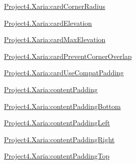 {\ttfamily \hyperlink{classproject4_1_1xaria_1_1R_1_1styleable_af0c0306982a503b9a005aebafa2f8251}{Project4.\+Xaria\+:card\+Corner\+Radius}}

{\ttfamily \hyperlink{classproject4_1_1xaria_1_1R_1_1styleable_a54bee07e94f96a7a6825da65d58be17f}{Project4.\+Xaria\+:card\+Elevation}}

{\ttfamily \hyperlink{classproject4_1_1xaria_1_1R_1_1styleable_a4be9ec95637f04c772f94899092a55f8}{Project4.\+Xaria\+:card\+Max\+Elevation}}

{\ttfamily \hyperlink{classproject4_1_1xaria_1_1R_1_1styleable_a335e1ca3184d29fcbeeec527602ab895}{Project4.\+Xaria\+:card\+Prevent\+Corner\+Overlap}}

{\ttfamily \hyperlink{classproject4_1_1xaria_1_1R_1_1styleable_a82b54eed1db5f90c00cd724eaee04e6e}{Project4.\+Xaria\+:card\+Use\+Compat\+Padding}}

{\ttfamily \hyperlink{classproject4_1_1xaria_1_1R_1_1styleable_a870488b5d76324f10a774fa2fd3498c8}{Project4.\+Xaria\+:content\+Padding}}

{\ttfamily \hyperlink{classproject4_1_1xaria_1_1R_1_1styleable_aefde665737e7cce8b5bf40fce5b28dc3}{Project4.\+Xaria\+:content\+Padding\+Bottom}}

{\ttfamily \hyperlink{classproject4_1_1xaria_1_1R_1_1styleable_a8e9c7e0442a01fba035b5de476459104}{Project4.\+Xaria\+:content\+Padding\+Left}}

{\ttfamily \hyperlink{classproject4_1_1xaria_1_1R_1_1styleable_a7989c5540f66e224b4c50c22a263699d}{Project4.\+Xaria\+:content\+Padding\+Right}}

{\ttfamily \hyperlink{classproject4_1_1xaria_1_1R_1_1styleable_a3b92595b1e8cae542bff3b32ab58c2b1}{Project4.\+Xaria\+:content\+Padding\+Top}}

